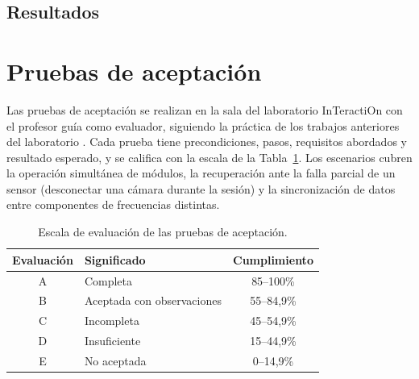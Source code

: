 \subsection{Resultados}


\section{Pruebas de aceptación}

Las pruebas de aceptación se realizan en la sala del laboratorio InTeractiOn con el profesor guía como evaluador, siguiendo la práctica de los trabajos anteriores del laboratorio \citep{estay2020modulo,pezoa2020implementacion,figueroa2025arquitectura}. Cada prueba tiene precondiciones, pasos, requisitos abordados y resultado esperado, y se califica con la escala de la Tabla~\ref{tab:escala}. Los escenarios cubren la operación simultánea de módulos, la recuperación ante la falla parcial de un sensor (desconectar una cámara durante la sesión) y la sincronización de datos entre componentes de frecuencias distintas.

\begin{table}[H]
\centering
\caption{Escala de evaluación de las pruebas de aceptación.}
\label{tab:escala}
\small
\begin{tabular}{clc}
\toprule
Evaluación & Significado & Cumplimiento \\ \midrule
A & Completa & 85--100\% \\
B & Aceptada con observaciones & 55--84,9\% \\
C & Incompleta & 45--54,9\% \\
D & Insuficiente & 15--44,9\% \\
E & No aceptada & 0--14,9\% \\ \bottomrule
\end{tabular}
\end{table}

